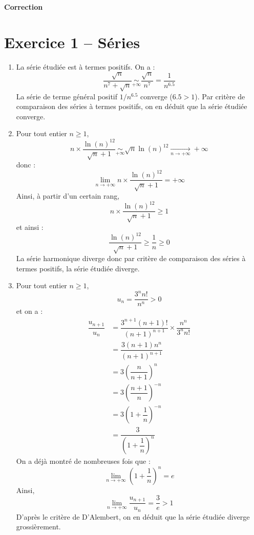 \documentclass[a4paper,twoside,french,10pt]{VcCours}
\begin{document}

\begin{center}
\large\bf
Correction
\end{center}
\separationTitre


\section*{Exercice 1 -- Séries}
\begin{enumerate}
    \item La série étudiée est à termes positifs. On a :
    $$ \dfrac{\sqrt{n}}{n^7+\sqrt{n}} \underset{+ \infty}{\sim} \dfrac{\sqrt{n}}{n^7} = \dfrac{1}{n^{6.5}}$$
    La série de terme général positif $1/n^{6.5}$ converge ($6.5>1$). Par critère de comparaison des séries à termes positifs, on en déduit que la série étudiée converge.
    \item Pour tout entier $n \geq 1$,
    $$ n \times \dfrac{\ln(n)^{12}}{\sqrt{n}+1}\underset{+ \infty}{\sim} \sqrt{n} \ln(n)^{12} \underset{n\rightarrow + \infty}{\longrightarrow} + \infty$$
    donc :
    $$ \lim_{n \rightarrow + \infty} n \times \dfrac{\ln(n)^{12}}{\sqrt{n}+1} = + \infty$$
    Ainsi, à partir d'un certain rang,
    $$ n \times \dfrac{\ln(n)^{12}}{\sqrt{n}+1} \geq 1$$
    et ainsi :
    $$ \dfrac{\ln(n)^{12}}{\sqrt{n}+1} \geq  \dfrac{1}{n} \geq 0$$
    La série harmonique diverge donc par critère de comparaison des séries à termes positifs, la série étudiée diverge.
    \item Pour tout entier $n \geq 1$,
    $$ u_n = \dfrac{3^n n!}{n^n} >0$$
    et on a :
    \begin{align*}
    \dfrac{u_{n+1}}{u_n} & = \dfrac{3^{n+1} (n+1)!}{(n+1)^{n+1}} \times \dfrac{n^n}{3^n n!} \\
    & = \dfrac{3(n+1)n^n}{(n+1)^{n+1}} \\
    & = 3  \left( \dfrac{n}{n+1} \right)^n \\
    & = 3 \left( \dfrac{n+1}{n} \right)^{-n}\\
    & = 3 \left( 1+ \dfrac{1}{n} \right)^{-n}\\
    & = \dfrac{3}{\left( 1+ \dfrac{1}{n} \right)^{n}}
    \end{align*}
    On a déjà montré de nombreuses fois que :
    $$ \lim_{n \rightarrow + \infty} \left( 1+ \dfrac{1}{n} \right)^{n} = e$$
    Ainsi,
    $$ \lim_{n \rightarrow + \infty} \dfrac{u_{n+1}}{u_n} = \dfrac{3}{e}>1$$
    D'après le critère de D'Alembert, on en déduit que la série étudiée diverge grossièrement.

\end{enumerate}
\end{document}
